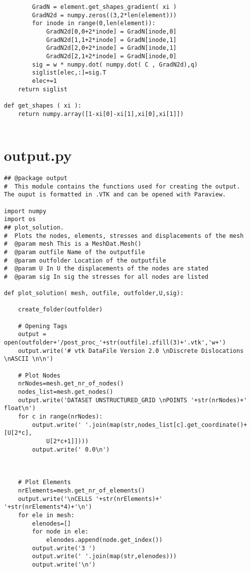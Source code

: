 \begin{appendices}
\begin{verbatim}
        GradN = element.get_shapes_gradient( xi )
        GradN2d = numpy.zeros((3,2*len(element)))
        for inode in range(0,len(element)):
            GradN2d[0,0+2*inode] = GradN[inode,0]
            GradN2d[1,1+2*inode] = GradN[inode,1]
            GradN2d[2,0+2*inode] = GradN[inode,1]
            GradN2d[2,1+2*inode] = GradN[inode,0]
        sig = w * numpy.dot( numpy.dot( C , GradN2d),q)
        siglist[elec,:]=sig.T
        elec+=1
    return siglist

def get_shapes ( xi ):
    return numpy.array([1-xi[0]-xi[1],xi[0],xi[1]])


\end{verbatim}

\section{output.py}
\begin{verbatim}
## @package output
#  This module contains the functions used for creating the output. 
The ouput is formatted in .VTK and can be opened with Paraview.

import numpy
import os
## plot_solution.
#  Plots the nodes, elements, stresses and displacements of the mesh
#  @param mesh This is a MeshDat.Mesh()
#  @param outfile Name of the outputfile
#  @param outfolder Location of the outputfile
#  @param U In U the displacements of the nodes are stated
#  @param sig In sig the stresses for all nodes are listed

def plot_solution( mesh, outfile, outfolder,U,sig):

    create_folder(outfolder)

    # Opening Tags
    output = open(outfolder+'/post_proc_'+str(outfile).zfill(3)+'.vtk','w+')
    output.write('# vtk DataFile Version 2.0 \nDiscrete Dislocations \nASCII \n\n')

    # Plot Nodes
    nrNodes=mesh.get_nr_of_nodes()
    nodes_list=mesh.get_nodes()
    output.write('DATASET UNSTRUCTURED_GRID \nPOINTS '+str(nrNodes)+' float\n')
    for c in range(nrNodes):
        output.write(' '.join(map(str,nodes_list[c].get_coordinate()+[U[2*c],
        	U[2*c+1]])))
        output.write(' 0.0\n')



    # Plot Elements
    nrElements=mesh.get_nr_of_elements()
    output.write('\nCELLS '+str(nrElements)+' '+str(nrElements*4)+'\n')
    for ele in mesh:
        elenodes=[]
        for node in ele:
            elenodes.append(node.get_index())
        output.write('3 ')
        output.write(' '.join(map(str,elenodes)))
        output.write('\n')


\end{verbatim}
\end{appendices}
